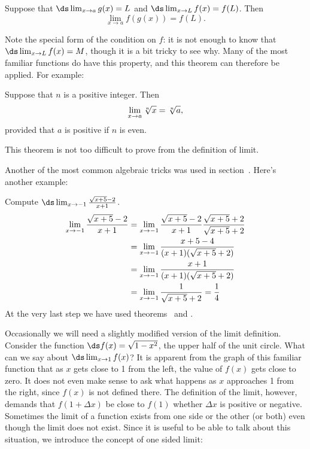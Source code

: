 \begin{theorem} Suppose that $\ds \lim_{x\to a}g(x)=L$ and $\ds \lim_{x\to L}f(x)=f(L)$. Then
$$\lim_{x\to a} f(g(x)) = f(L).$$
\label{thm:limit of composition}
\end{theorem}

Note the special form of the condition on $f$: it is not enough to
know that $\ds\lim_{x\to L}f(x) = M$, though it is a bit tricky to see
why. Many of the most familiar functions do have this property, and
this theorem can therefore be applied. For example:

\begin{theorem} Suppose that $n$ is a positive integer. Then
$$\lim_{x\to a}\root n\of{x} = \root n\of{a},$$
provided that $a$ is positive if $n$ is even.
\label{thm:continuity of roots}
\end{theorem}

This theorem is not too difficult to prove from the definition of limit.

Another of the most common algebraic tricks was used in
section~. Here's another example:

\begin{example}
Compute $\ds\lim_{x\to-1} {\sqrt{x+5}-2\over x+1}$.
\begin{align*}
\lim_{x\to-1} {\sqrt{x+5}-2\over x+1}&=
\lim_{x\to-1} {\sqrt{x+5}-2\over x+1}{\sqrt{x+5}+2\over \sqrt{x+5}+2} \\
&=\lim_{x\to-1} {x+5-4\over (x+1)(\sqrt{x+5}+2)} \\
&=\lim_{x\to-1} {x+1\over (x+1)(\sqrt{x+5}+2)} \\
&=\lim_{x\to-1} {1\over \sqrt{x+5}+2}={1\over4} \\
\end{align*}
At the very last step we have used theorems~ and .
\end{example}

Occasionally we will need a slightly modified version of the limit
definition. Consider the function $\ds f(x)=\sqrt{1-x^2}$, the upper half of
the unit circle. What can we say about $\ds \lim_{x\to 1}f(x)$? It is
apparent from the graph of this familiar function that as $x$ gets
close to 1 from the left, the value of $f(x)$ gets close to zero. It
does not even make sense to ask what happens as $x$ approaches 1 from
the right, since $f(x)$ is not defined there. The definition of the
limit, however, demands that $f(1+\Delta x)$ be close to $f(1)$
whether $\Delta x$ is positive or negative. Sometimes the limit of a
function exists from one side or the other (or both) even though the
limit does not exist. Since it is useful to be able to talk about this
situation, we introduce the concept of 
{\dfont one sided limit}:

